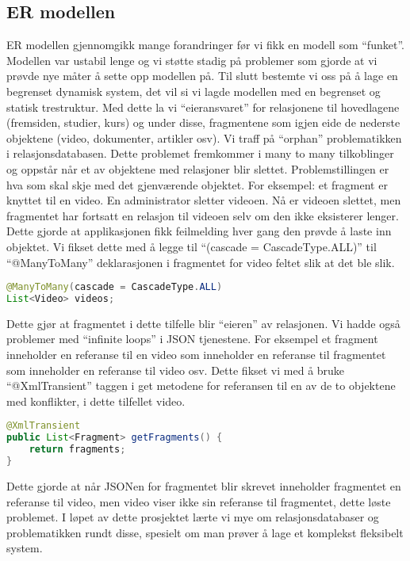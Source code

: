 \documentclass[../main.tex]{subfiles}
\begin{document}
\subsection{ER modellen}
ER modellen gjennomgikk mange forandringer før vi fikk en modell som “funket”. Modellen var ustabil lenge og vi støtte stadig på problemer som gjorde at vi prøvde nye måter å sette opp modellen på. Til slutt bestemte vi oss på å lage en begrenset dynamisk system, det vil si vi lagde modellen med en begrenset og statisk trestruktur. Med dette la vi “eieransvaret” for relasjonene til hovedlagene (fremsiden, studier, kurs) og under disse, fragmentene som igjen eide de nederste objektene (video, dokumenter, artikler osv). \newline
Vi traff på “orphan” problematikken i relasjonsdatabasen. Dette problemet fremkommer i many to many tilkoblinger og oppstår når et av objektene med relasjoner blir slettet. Problemstillingen er hva som skal skje med det gjenværende objektet. For eksempel: et fragment er knyttet til en video. En administrator sletter videoen. Nå er videoen slettet, men fragmentet har fortsatt en relasjon til videoen selv om den ikke eksisterer lenger. Dette gjorde at applikasjonen fikk feilmelding hver gang den prøvde å laste inn objektet. Vi fikset dette med å legge til “(cascade = CascadeType.ALL)” til “@ManyToMany” deklarasjonen i fragmentet for video feltet slik at det ble slik.

\begin{lstlisting}[language=Java, frame=single]
@ManyToMany(cascade = CascadeType.ALL)
List<Video> videos;
\end{lstlisting}
Dette gjør at fragmentet i dette tilfelle blir “eieren” av relasjonen. \newline
\newline
Vi hadde også problemer med “infinite loops” i JSON tjenestene. For eksempel et fragment inneholder en referanse til en video som inneholder en referanse til fragmentet som inneholder en referanse til video osv. Dette fikset vi med å bruke “@XmlTransient” taggen i get metodene for referansen til en av de to objektene med konflikter, i dette tilfellet video.

\begin{lstlisting}[language=Java, frame=single]
@XmlTransient
public List<Fragment> getFragments() {
    return fragments;
}
\end{lstlisting}
Dette gjorde at når JSONen for fragmentet blir skrevet inneholder fragmentet en referanse til video, men video viser ikke sin referanse til fragmentet, dette løste problemet.\newline
\newline
I løpet av dette prosjektet lærte vi mye om relasjonsdatabaser og problematikken rundt disse, spesielt om man prøver å lage et komplekst fleksibelt system.
\end{document}
